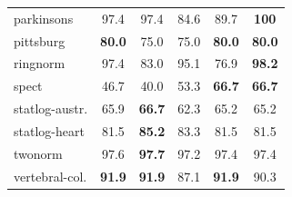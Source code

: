 \begin{table}[t]
\begin{small}
\begin{tabular}{lccccc}
			parkinsons        & 97.4             & 97.4            & 84.6          & 89.7          & \textbf{100}  \\
			pittsburg         & \textbf{80.0}    & 75.0            & 75.0          & \textbf{80.0} & \textbf{80.0} \\
			ringnorm          & 97.4             & 83.0            & 95.1          & 76.9          & \textbf{98.2} \\
			spect             & 46.7             & 40.0            & 53.3          & \textbf{66.7} & \textbf{66.7} \\
			statlog-austr.    & 65.9             & \textbf{66.7}   & 62.3          & 65.2          & 65.2          \\
			statlog-heart     & 81.5             & \textbf{85.2}   & 83.3          & 81.5          & 81.5          \\
			twonorm           & 97.6             & \textbf{97.7}   & 97.2          & 97.4          & 97.4          \\
			vertebral-col.    & \textbf{91.9}    & \textbf{91.9}   & 87.1          & \textbf{91.9} & 90.3          \\ \bottomrule
		\end{tabular}
	\end{small}
\end{table}
